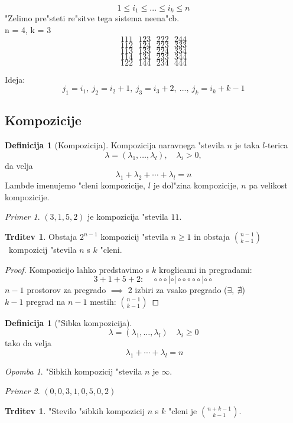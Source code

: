 \documentclass[a4paper,12pt]{article}
\theoremstyle{definition}
\newtheorem{defn}[counter]{Definicija}
\newtheorem{claim}[counter]{Trditev}
\theoremstyle{remark}
\newtheorem*{ex}{Primer}
\newtheorem*{rem}{Opomba}
\begin{document}
\label{TODO: what is this??}
\[1 \leqslant i_1 \leqslant ... \leqslant i_k \leqslant n\]
"Zelimo pre"steti re"sitve tega sistema neena"cb.\\
n = 4, k = 3
\[1 1 1 \ \ \ 1 2 3 \ \ \ 2 2 2 \ \ \ 2 4 4\]
\[1 1 2 \ \ \ 1 2 4 \ \ \ 2 2 3 \ \ \ 3 3 3\]
\[1 1 3 \ \ \ 1 3 3 \ \ \ 2 2 4 \ \ \ 3 3 4\]
\[1 1 4 \ \ \ 1 3 4 \ \ \ 2 3 3 \ \ \ 3 4 4\]
\[1 2 2 \ \ \ 1 4 4 \ \ \ 2 3 4 \ \ \ 4 4 4\]

Ideja:
\[j_1 = i_1, \ j_2 = i_2 + 1, \ j_3 = i_3 + 2, \ ..., \ j_k = i_k + k - 1 \]

\subsection{Kompozicije}
\begin{defn}[Kompozicija]
	Kompozicija naravnega "stevila $n$ je taka $l$-terica
	\[ \lambda = (\lambda_1, \ldots, \lambda_l), \quad \lambda_i > 0,\]
	da velja
	\[\lambda_1 + \lambda_2 + \cdots + \lambda_l = n\]
	Lambde imenujemo "cleni kompozicije, $l$ je dol"zina kompozicije, $n$ pa velikost kompozicije.
\end{defn}
\begin{ex}
	$(3, 1, 5, 2)$ je kompozicija "stevila $11$.
\end{ex}


\begin{claim}
	Obstaja $2^{n-1}$ kompozicij "stevila $n \geqslant 1$ in obstaja $\binom{n - 1}{k - 1}$~kompozicij "stevila $n$ s $k$ "cleni.
\end{claim}

\begin{proof}
	Kompozicijo lahko predstavimo s $k$ kroglicami in pregradami:
	\[
		3 + 1 + 5 + 2: \quad
		\circ \circ \circ|\circ|\circ \circ \circ \circ \circ |\circ \circ
	\]
	$n - 1$ prostorov za pregrado $\implies$ 2 izbiri za vsako pregrado ($\exists, \ \nexists$)\\
	$k - 1$ pregrad na $n - 1$ mestih: $\binom{n - 1}{k - 1}$
\end{proof}

\begin{defn}["Sibka kompozicija]
	\[ \lambda = (\lambda_1, \ldots, \lambda_l) \quad \lambda_i \geqslant 0\]
	tako da velja
	\[ \ \lambda_1 + \cdots + \lambda_l = n\]
\end{defn}
\begin{rem}
	"Sibkih kompozicij "stevila $n$ je $\infty$.
\end{rem}
\begin{ex}
	$(0, 0, 3, 1, 0, 5, 0, 2)$
\end{ex}
\begin{claim}
	"Stevilo "sibkih kompozicij $n$ s $k$ "cleni je $\binom{n + k-1}{k - 1}$.
\end{claim}
\end{document}
